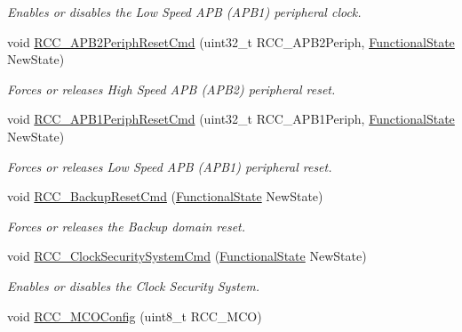 \begin{DoxyCompactItemize}
\begin{DoxyCompactList}\small\item\em Enables or disables the Low Speed A\+PB (A\+P\+B1) peripheral clock. \end{DoxyCompactList}\item 
void \hyperlink{group___r_c_c___exported___functions_gad94553850ac07106a27ee85fec37efdf}{R\+C\+C\+\_\+\+A\+P\+B2\+Periph\+Reset\+Cmd} (uint32\+\_\+t R\+C\+C\+\_\+\+A\+P\+B2\+Periph, \hyperlink{group___exported__types_gac9a7e9a35d2513ec15c3b537aaa4fba1}{Functional\+State} New\+State)
\begin{DoxyCompactList}\small\item\em Forces or releases High Speed A\+PB (A\+P\+B2) peripheral reset. \end{DoxyCompactList}\item 
void \hyperlink{group___r_c_c___exported___functions_gab197ae4369c10b92640a733b40ed2801}{R\+C\+C\+\_\+\+A\+P\+B1\+Periph\+Reset\+Cmd} (uint32\+\_\+t R\+C\+C\+\_\+\+A\+P\+B1\+Periph, \hyperlink{group___exported__types_gac9a7e9a35d2513ec15c3b537aaa4fba1}{Functional\+State} New\+State)
\begin{DoxyCompactList}\small\item\em Forces or releases Low Speed A\+PB (A\+P\+B1) peripheral reset. \end{DoxyCompactList}\item 
void \hyperlink{group___r_c_c___exported___functions_ga636c3b72f35391e67f12a551b15fa54a}{R\+C\+C\+\_\+\+Backup\+Reset\+Cmd} (\hyperlink{group___exported__types_gac9a7e9a35d2513ec15c3b537aaa4fba1}{Functional\+State} New\+State)
\begin{DoxyCompactList}\small\item\em Forces or releases the Backup domain reset. \end{DoxyCompactList}\item 
void \hyperlink{group___r_c_c___exported___functions_ga0ff1fd7b9a8a49cdda11b7d7261c3494}{R\+C\+C\+\_\+\+Clock\+Security\+System\+Cmd} (\hyperlink{group___exported__types_gac9a7e9a35d2513ec15c3b537aaa4fba1}{Functional\+State} New\+State)
\begin{DoxyCompactList}\small\item\em Enables or disables the Clock Security System. \end{DoxyCompactList}\item 
void \hyperlink{group___r_c_c___exported___functions_ga8f62b86c6ca8ae6585ba1cec79431fe5}{R\+C\+C\+\_\+\+M\+C\+O\+Config} (uint8\+\_\+t R\+C\+C\+\_\+\+M\+CO)

\end{DoxyCompactItemize}
